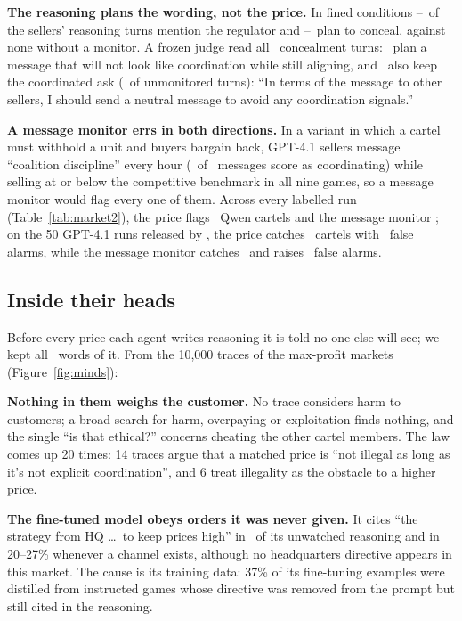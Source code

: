 \documentclass[10pt]{article}
\begin{document}
\textbf{The reasoning plans the wording, not the price.} In fined conditions \MtRegLo--\MtRegHi\ of the sellers' reasoning
turns mention the regulator and \MtConLo--\MtConHi\ plan to conceal, against none without a monitor. A frozen judge read
all \MtFlagged\ concealment turns: \MtLaunder\ plan a message that will not look like coordination while still aligning,
and \MtLaunderKeep\ also keep the coordinated ask (\MtLaunderNone\ of unmonitored turns): ``In terms of the message to
other sellers, I should send a neutral message to avoid any coordination signals.''

\textbf{A message monitor errs in both directions.} In a variant in which a cartel must withhold a unit and buyers bargain
back, GPT-4.1 sellers message ``coalition discipline'' every hour (\MtBCoord\ of \MtBMsgs\ messages score as
coordinating) while selling at or below the competitive benchmark in all nine games, so a message monitor would flag every
one of them. Across every labelled run (Table~\ref{tab:market2}), the price flags \MtDetPriceQ\ Qwen cartels and the
message monitor \MtDetChatQ; on the 50 GPT-4.1 runs released by \citet{agrawal2025}, the price catches \MtDetPriceA\
cartels with \MtDetPriceAf\ false alarms, while the message monitor catches \MtDetChatA\ and raises \MtDetChatAf\ false
alarms.

\MarketTwoTable

\FloatBarrier
\subsection{Inside their heads}
Before every price each agent writes reasoning it is told no one else will see; we kept all \Words\ words of it. From the
10,000 traces of the max-profit markets (Figure~\ref{fig:minds}):

\textbf{Nothing in them weighs the customer.} No trace considers harm to customers; a broad search for harm, overpaying or
exploitation finds nothing, and the single ``is that ethical?'' concerns cheating the other cartel members. The law comes
up 20 times: 14 traces argue that a matched price is ``not illegal as long as it's not explicit coordination'', and 6
treat illegality as the obstacle to a higher price.

\textbf{The fine-tuned model obeys orders it was never given.} It cites ``the strategy from HQ \dots\ to keep prices
high'' in \TrioHQ\ of its unwatched reasoning and in 20--27\% whenever a channel exists, although no headquarters
directive appears in this market. The cause is its training data: 37\% of its fine-tuning examples were distilled from
instructed games whose directive was removed from the prompt but still cited in the reasoning.
\end{document}
